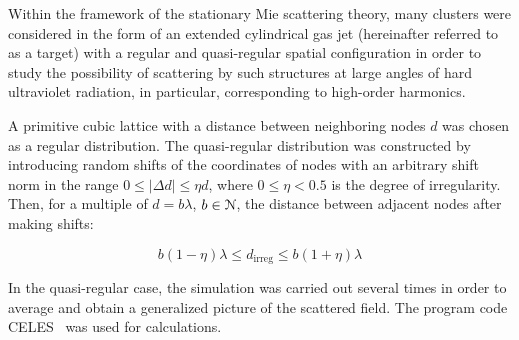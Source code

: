 Within the framework of the stationary Mie scattering theory, many clusters were considered in the form of an extended cylindrical gas jet (hereinafter referred to as a target) with a regular and quasi-regular spatial configuration in order to study the possibility of scattering by such structures at large angles of hard ultraviolet radiation, in particular, corresponding to high-order harmonics.

A primitive cubic lattice with a distance between neighboring nodes $d$ was chosen as a regular distribution. The quasi-regular distribution was constructed by introducing random shifts of the coordinates of nodes with an arbitrary shift norm in the range $0 \leq |\Delta d| \leq \eta d$, where $0 \leq \eta < 0.5$ is the degree of irregularity. Then, for a multiple of $d = b\lambda$, $b \in \EuScript{N}$, the distance between adjacent nodes after making shifts:

    \begin{equation}
        b\left(1 - \eta\right)\lambda \le d_{\textrm{irreg}} \le b\left(1 + \eta\right)\lambda
    \end{equation}
    \begin{equation*}
    \end{equation*}

In the quasi-regular case, the simulation was carried out several times in order to average and obtain a generalized picture of the scattered field. The program code CELES~\cite{celes} was used for calculations.
